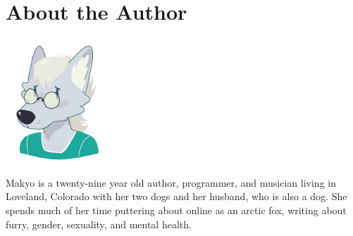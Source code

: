 \chapter*{About the Author}

\begin{center}
  \includegraphics[width=0.3\textwidth]{roryfrancis--fret--makyo.png}
\end{center}

Makyo is a twenty-nine year old author, programmer, and musician living in Loveland, Colorado with her two dogs and her husband, who is also a dog.  She spends much of her time puttering about online as an arctic fox, writing about furry, gender, sexuality, and mental health.
